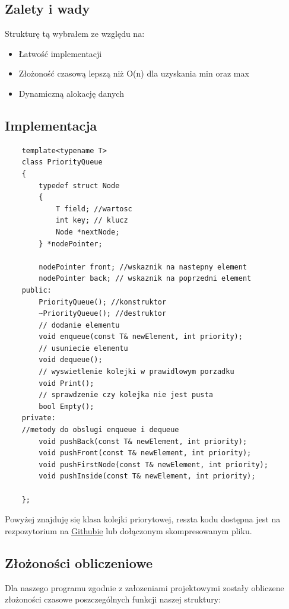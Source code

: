 \documentclass{article}
\begin{document}
\subsection{Zalety i wady}
Strukturę tą wybrałem ze względu na:
\begin{itemize}
    \item Łatwość implementacji
    \item Złożoność czasową lepszą niż O(n) dla uzyskania min oraz max
    \item Dynamiczną alokację danych
\end{itemize}


\subsection{Implementacja}

\begin{lstlisting}
    template<typename T>
    class PriorityQueue
    {
        typedef struct Node
        {
            T field; //wartosc 
            int key; // klucz
            Node *nextNode; 
        } *nodePointer;
    
        nodePointer front; //wskaznik na nastepny element
        nodePointer back; // wskaznik na poprzedni element
    public:
        PriorityQueue(); //konstruktor
        ~PriorityQueue(); //destruktor
        // dodanie elementu
        void enqueue(const T& newElement, int priority); 
        // usuniecie elementu
        void dequeue(); 
        // wyswietlenie kolejki w prawidlowym porzadku
        void Print(); 
        // sprawdzenie czy kolejka nie jest pusta
        bool Empty(); 
    private:
    //metody do obslugi enqueue i dequeue
        void pushBack(const T& newElement, int priority); 
        void pushFront(const T& newElement, int priority);
        void pushFirstNode(const T& newElement, int priority);
        void pushInside(const T& newElement, int priority);
        
    };
    \end{lstlisting}
    
Powyżej znajduję się klasa kolejki priorytowej, reszta kodu dostępna jest na 
rezpozytorium na \href{https://github.com/Damiry0/PAMSI}{Githubie} lub dołączonym skompresowanym pliku.
\newpage
\subsection{Złożoności obliczeniowe}
Dla naszego programu zgodnie z załozeniami projektowymi zostały obliczene złożoności czasowe poszczególnych 
funkcji naszej struktury:
\end{document}
